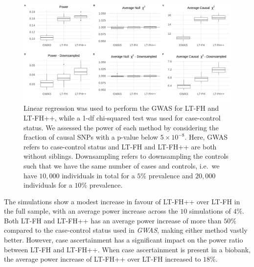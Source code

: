 \begin{figure}[h]
	\includegraphics[width=\textwidth]{results/boxplot_05prev_both.png}
	\caption[Simulation results for a $ 5\% $ prevalence, with and without downsampling of controls]{Linear regression was used to perform the GWAS for LT-FH and LT-FH++, while a 1-df chi-squared test was used for case-control status. We assessed the power of each method by considering the fraction of causal SNPs with a p-value below $ 5 \times 10^{-8} $. Here, GWAS refers to case-control status and LT-FH and LT-FH++ are both without siblings. Downsampling refers to downsampling the controls such that we have the same number of cases and controls, i.e.\, we have $ 10,000 $ individuals in total for a $ 5\% $ prevalence and $ 20,000 $ individuals for a $ 10\% $ prevalence.}
	\label{fig:LTFHppSimulationResults}
\end{figure}

The simulations show a modest increase in favour of LT-FH++ over LT-FH in the full sample, with an average power increase across the $ 10 $ simulations of $ 4\% $. Both LT-FH and LT-FH++ has an average power increase of more than $ 50\% $ compared to the case-control status used in \textit{GWAS}, making either method vastly better. However, case ascertainment has a significant impact on the power ratio between LT-FH and LT-FH++. When case ascertainment is present in a biobank, the average power increase of LT-FH++ over LT-FH increased to $ 18\% $.

\newpage

